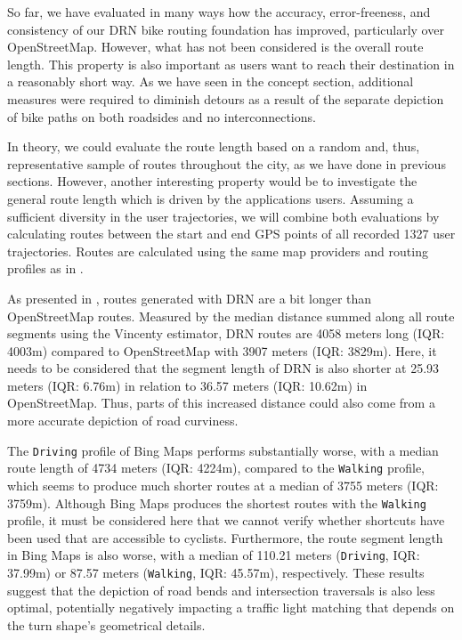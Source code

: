 So far, we have evaluated in many ways how the accuracy, error-freeness, and consistency of our DRN bike routing foundation has improved, particularly over OpenStreetMap. However, what has not been considered is the overall route length. This property is also important as users want to reach their destination in a reasonably short way. As we have seen in the concept section, additional measures were required to diminish detours as a result of the separate depiction of bike paths on both roadsides and no interconnections. 

In theory, we could evaluate the route length based on a random and, thus, representative sample of routes throughout the city, as we have done in previous sections. However, another interesting property would be to investigate the general route length which is driven by the applications users. Assuming a sufficient diversity in the user trajectories, we will combine both evaluations by calculating routes between the start and end GPS points of all recorded 1327 user trajectories. Routes are calculated using the same map providers and routing profiles as in .

As presented in , routes generated with DRN are a bit longer than OpenStreetMap routes. Measured by the median distance summed along all route segments using the Vincenty estimator, DRN routes are 4058 meters long (IQR: 4003m) compared to OpenStreetMap with 3907 meters (IQR: 3829m). Here, it needs to be considered that the segment length of DRN is also shorter at 25.93 meters (IQR: 6.76m) in relation to 36.57 meters (IQR: 10.62m) in OpenStreetMap. Thus, parts of this increased distance could also come from a more accurate depiction of road curviness. 

The \texttt{Driving} profile of Bing Maps performs substantially worse, with a median route length of 4734 meters (IQR: 4224m), compared to the \texttt{Walking} profile, which seems to produce much shorter routes at a median of 3755 meters (IQR: 3759m). Although Bing Maps produces the shortest routes with the \texttt{Walking} profile, it must be considered here that we cannot verify whether shortcuts have been used that are accessible to cyclists. Furthermore, the route segment length in Bing Maps is also worse, with a median of 110.21 meters (\texttt{Driving}, IQR: 37.99m) or 87.57 meters (\texttt{Walking}, IQR: 45.57m), respectively. These results suggest that the depiction of road bends and intersection traversals is also less optimal, potentially negatively impacting a traffic light matching that depends on the turn shape's geometrical details. 


